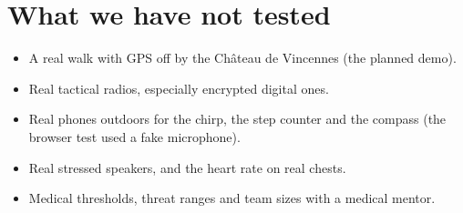 \section{What we have not tested}

\begin{itemize}
  \item A real walk with GPS off by the Château de Vincennes (the planned demo).
  \item Real tactical radios, especially encrypted digital ones.
  \item Real phones outdoors for the chirp, the step counter and the compass (the browser test used a fake microphone).
  \item Real stressed speakers, and the heart rate on real chests.
  \item Medical thresholds, threat ranges and team sizes with a medical mentor.
\end{itemize}
